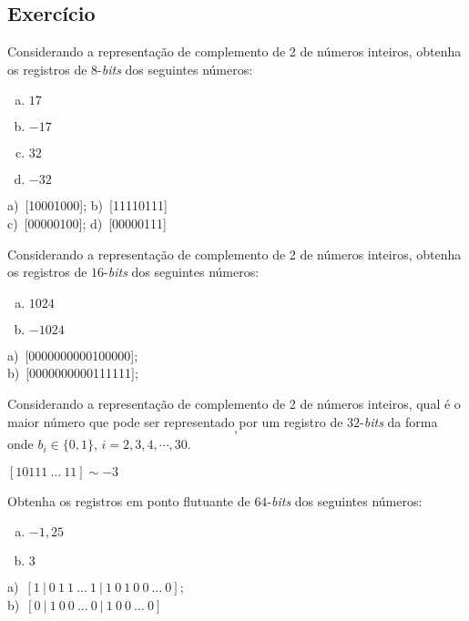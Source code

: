 \subsection{Exercício}

\begin{exer}
  Considerando a representação de complemento de 2 de números inteiros, obtenha os registros de $8$-{\it bits} dos seguintes números:
  \begin{enumerate}[a)]
  \item $17$
  \item $-17$
  \item $32$
  \item $-32$
  \end{enumerate}
\end{exer}
\begin{resp}
  a)~[10001000]; b)~[11110111]\\
  c)~[00000100]; d)~[00000111]
\end{resp}

\begin{exer}
  Considerando a representação de complemento de 2 de números inteiros, obtenha os registros de $16$-{\it bits} dos seguintes números:
  \begin{enumerate}[a)]
  \item $1024$
  \item $-1024$
  \end{enumerate}
\end{exer}
\begin{resp}
    a)~[0000000000100000]; \\
    b)~[0000000000111111];
\end{resp}

\begin{exer}
  Considerando a representação de complemento de 2 de números inteiros, qual é o maior número que pode ser representado por um registro de $32$-{\it bits} da forma
  \begin{equation}
    [1 ~ 0 ~ b_2 ~ b_3 ~ b_4 ~ \cdots ~ b_{30} ~ 1],
  \end{equation}
onde $b_i \in \{0, 1\}$, $i=2, 3, 4, \cdots, 30$.
\end{exer}
\begin{resp}
  $[10111~\ldots~11] \sim -3$
\end{resp}

\begin{exer}
  Obtenha os registros em ponto flutuante de $64$-{\it bits} dos seguintes números:
  \begin{enumerate}[a)]
  \item $-1,25$
  \item $3$
  \end{enumerate}
\end{exer}
\begin{resp}
    a)~$[1 ~ | ~ 0 ~ 1 ~ 1 ~ \ldots ~ 1 ~ | ~ 1 ~ 0 ~ 1 ~ 0 ~ 0 ~ \ldots ~ 0]$;\\
    b)~$[0 ~ | ~ 1 ~ 0 ~ 0 ~ \ldots ~ 0 ~ | ~ 1 ~ 0 ~ 0 ~ \ldots ~ 0]$
\end{resp}

